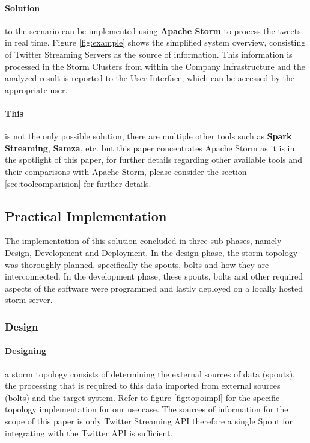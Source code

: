 \documentclass[runningheads,a4paper]{llncs}[2015/06/24]
\begin{document}
\paragraph{Solution} to the scenario can be implemented using \textbf{Apache Storm} to process the tweets in real time. Figure \ref{fig:example} shows the simplified system overview, consisting of Twitter Streaming Servers as the source of information. This information is processed in the Storm Clusters from within the Company Infrastructure and the analyzed result is reported to the User Interface, which can be accessed by the appropriate user.

\paragraph{This} is not the only possible solution, there are multiple other tools such as \textbf{Spark Streaming}, \textbf{Samza}, etc. but this paper concentrates Apache Storm as it is in the spotlight of this paper, for further details regarding other available tools and their comparisons with Apache Storm, please consider the section \ref{sec:toolcomparision} for further details.

\subsection{Practical Implementation}
The implementation of this solution concluded in three sub phases, namely Design, Development and Deployment. In the design phase, the storm topology was thoroughly planned, specifically the spouts, bolts and how they are interconnected. In the development phase, these spouts, bolts and other required aspects of the software were programmed and lastly deployed on a locally hosted storm server.

\subsubsection{Design}
\paragraph{Designing} a storm topology consists of determining the external sources of data (spouts), the processing that is required to this data imported from external sources (bolts) and the target system. Refer to figure \ref{fig:topoimpl} for the specific topology implementation for our use case. The sources of information for the scope of this paper is only Twitter Streaming API therefore a single Spout for integrating with the Twitter API is sufficient.
\end{document}
